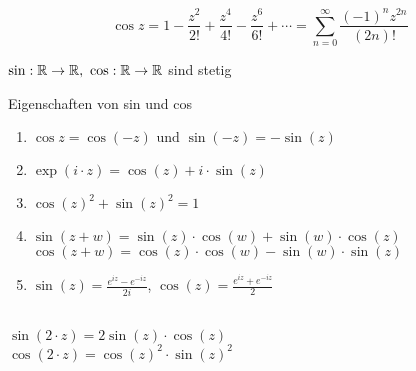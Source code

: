 \[\cos z = 1 - \frac{z^2}{2!} + \frac{z^4}{4!} - \frac{z^6}{6!} + \cdots = \sum_{n=0}^\infty \frac{(-1)^n z^{2n}}{(2n)!} \]

\Satz[3.8.1] $\sin : \mathbb{R} \rightarrow \mathbb{R},  \ \cos : \mathbb{R} \rightarrow \mathbb{R}$ sind stetig

\Satz[3.8.2] Eigenschaften von sin und cos
\begin{enumerate}
	\item $\cos z = \cos(-z) \text{ und } \sin(-z) = -\sin(z)$
	\item $\exp(i \cdot z) = \cos(z) + i \cdot \sin(z)$
	\item $\cos(z)^2 + \sin(z)^2 = 1$
	\item $\sin(z+w) = \sin(z) \cdot \cos(w) + \sin(w) \cdot \cos(z)$ \\
	 $\cos(z+w) = \cos(z) \cdot \cos(w) - \sin(w) \cdot \sin(z)$ 
	\item $\sin(z) = \frac{e^{iz}-e^{-iz}}{2i}$, $\cos(z) = \frac{e^{iz}+e^{-iz}}{2}$
\end{enumerate}

\Korollar[3.8.3] \\
\( \sin(2 \cdot z) = 2 \sin(z) \cdot \cos(z) \) \\ 
\(\cos(2 \cdot z) = \cos(z)^2 \cdot \sin(z)^2 \)